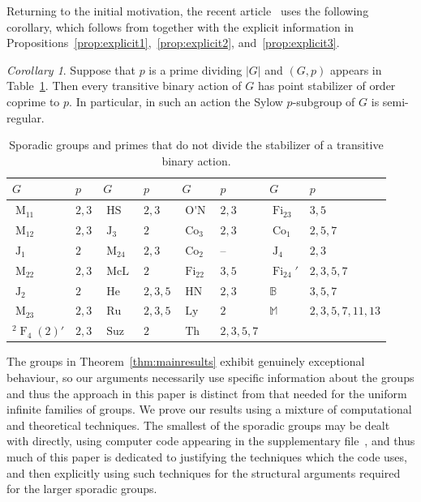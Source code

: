 \documentclass[11pt,a4paper]{amsart}
\theoremstyle{plain}
\theoremstyle{definition}
\theoremstyle{remark}
\newtheorem{corollary}[definition]{Corollary}
\theoremstyle{remark}
\theoremstyle{remark}
\theoremstyle{definition}
\newcommand{\twist}[1]{%
  {}^{2}\!#1%
}
\newcommand{\BM}{\mathbb{B}}
\newcommand{\MM}{\mathbb{M}}
\DeclareMathOperator{\Ly}{Ly}
\DeclareMathOperator{\McL}{McL}
\DeclareMathOperator{\M}{M}
\DeclareMathOperator{\HN}{HN}
\DeclareMathOperator{\HS}{HS}
\DeclareMathOperator{\He}{He}
\DeclareMathOperator{\J}{J}
\DeclareMathOperator{\Suz}{Suz}
\DeclareMathOperator{\Th}{Th}
\DeclareMathOperator{\Co}{Co}
\DeclareMathOperator{\ON}{O'N}
\DeclareMathOperator{\Ru}{Ru}
\DeclareMathOperator{\Fi}{Fi}
\DeclareMathOperator{\F}{F}
\begin{document}
Returning to the initial motivation, the recent article~\cite{delvallegill2025+} uses the following corollary, which follows from \cite[Corollary~2.13]{GG25} together with the explicit information in Propositions~\ref{prop:explicit1},~\ref{prop:explicit2}, and~\ref{prop:explicit3}.

\begin{corollary}
Suppose that $p$ is a prime dividing $|G|$ and $ (G,p)$ appears in Table~\ref{tbl:forbiddenpbinary}. Then every transitive binary action of $G$ has point stabilizer of order coprime to $p$. In particular, in such an action the Sylow $p$-subgroup of $G$ is semi-regular.
\end{corollary}

\begin{table}[ht]
\centering
\begin{tabular}{|ll|ll|ll|ll|}\hline
$G$            & $p$   & $G$       & $p$     & $G$        & $p$       & $G$         & $p$             \\ \hline
$\M_{11}$      & $2,3$ & $\HS$     & $2,3$   & $\ON$      & $2,3$     & $\Fi_{23}$  & $3,5$           \\
$\M_{12}$      & $2,3$ & $\J_3$    & $2$     & $\Co_3$    & $2,3$     & $\Co_1$     & $2,5,7$         \\
$\J_1$         & $2$   & $\M_{24}$ & $2,3$   & $\Co_2$    & --        & $\J_4$      & $2,3$           \\
$\M_{22}$      & $2,3$ & $\McL$    & $2$     & $\Fi_{22}$ & $3,5$     & $\Fi_{24}'$ & $2,3,5,7$       \\
$\J_2$         & $2$   & $\He$     & $2,3,5$ & $\HN$      & $2,3$     & $\BM$       & $3,5,7$         \\
$\M_{23}$      & $2,3$ & $\Ru$     & $2,3,5$ & $\Ly$      & $2$       & $\MM$       & $2,3,5,7,11,13$ \\
$\twist\F_4(2)'$ & $2,3$ & $\Suz$    & $2$     & $\Th$      & $2,3,5,7$ &             &   \\             \hline
\end{tabular}
\caption{Sporadic groups and primes that do not divide the stabilizer of a transitive binary action.}
\label{tbl:forbiddenpbinary}
\end{table}


The groups in Theorem~\ref{thm:mainresults} exhibit genuinely exceptional behaviour, so our arguments necessarily use specific information about the groups and thus the approach in this paper is distinct from that needed for the uniform infinite families of groups. We prove our results using a mixture of computational and theoretical techniques. The smallest of the sporadic groups may be dealt with directly, using computer code appearing in the supplementary file~\cite{codesup}, and thus much of this paper is dedicated to justifying the techniques which the code uses, and then explicitly using such techniques for the structural arguments required for the larger sporadic groups.
\end{document}
